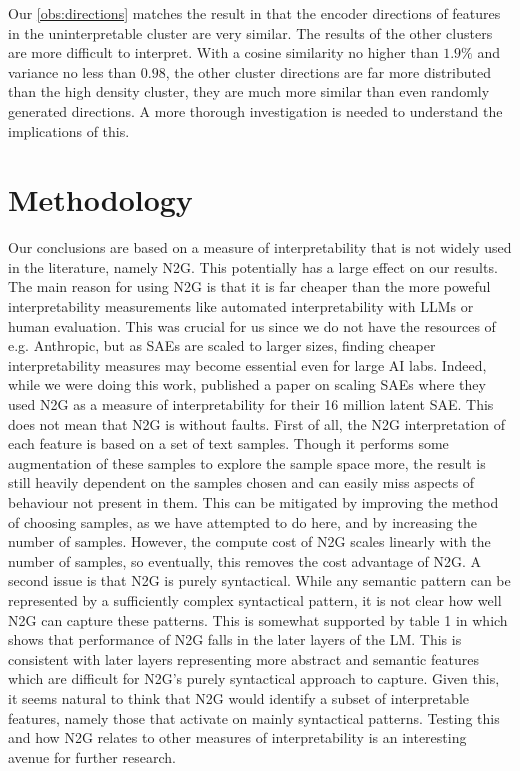 Our \ref{obs:directions} matches the result in \textcite{nanda_open_2023} that the encoder directions of features in the uninterpretable cluster are very similar.
The results of the other clusters are more difficult to interpret.
With a cosine similarity no higher than $1.9\%$ and variance no less than $0.98$, the other cluster directions are far more distributed than the high density cluster, they are much more similar than even randomly generated directions.
A more thorough investigation is needed to understand the implications of this.


\section{Methodology}
\label{sec:n2g_interpretability}
Our conclusions are based on a measure of interpretability that is not widely used in the literature, namely \ac{N2G}.
This potentially has a large effect on our results.
The main reason for using \ac{N2G} is that it is far cheaper than the more poweful interpretability measurements like automated interpretability with \ac{LLM}s or human evaluation.
This was crucial for us since we do not have the resources of e.g. Anthropic, but as \acp{SAE} are scaled to larger sizes, finding cheaper interpretability measures may become essential even for large AI labs.
Indeed, while we were doing this work, \textcite{gao_scaling_2024} published a paper on scaling \acp{SAE} where they used \ac{N2G} as a measure of interpretability for their 16 million latent SAE.
This does not mean that \ac{N2G} is without faults.
First of all, the \ac{N2G} interpretation of each feature is based on a set of text samples.
Though it performs some augmentation of these samples to explore the sample space more, the result is still heavily dependent on the samples chosen and can easily miss aspects of behaviour not present in them.
This can be mitigated by improving the method of choosing samples, as we have attempted to do here, and by increasing the number of samples.
However, the compute cost of \ac{N2G} scales linearly with the number of samples, so eventually, this removes the cost advantage of \ac{N2G}.
A second issue is that \ac{N2G} is purely syntactical.
While any semantic pattern can be represented by a sufficiently complex syntactical pattern, it is not clear how well \ac{N2G} can capture these patterns.
This is somewhat supported by table 1 in \textcite{foote_neuron_2023} which shows that performance of \ac{N2G} falls in the later layers of the \ac{LM}.
This is consistent with later layers representing more abstract and semantic features which are difficult for \ac{N2G}'s purely syntactical approach to capture.
Given this, it seems natural to think that \ac{N2G} would identify a subset of interpretable features, namely those that activate on mainly syntactical patterns.
Testing this and how \ac{N2G} relates to other measures of interpretability is an interesting avenue for further research.


